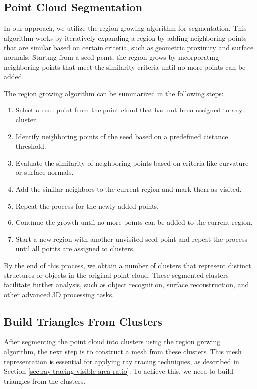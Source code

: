 \documentclass[11pt, a4paper,oneside,chapterprefix=false]{scrbook}
\begin{document}
\subsection{Point Cloud Segmentation}

In our approach, we utilize the region growing algorithm for segmentation. This algorithm works by iteratively expanding a region by adding neighboring points that are similar based on certain criteria, such as geometric proximity and surface normals. Starting from a seed point, the region grows by incorporating neighboring points that meet the similarity criteria until no more points can be added.

The region growing algorithm can be summarized in the following steps:
\begin{enumerate}
    \item Select a seed point from the point cloud that has not been assigned to any cluster.
    \item Identify neighboring points of the seed based on a predefined distance threshold.
    \item Evaluate the similarity of neighboring points based on criteria like curvature or surface normals.
    \item Add the similar neighbors to the current region and mark them as visited.
    \item Repeat the process for the newly added points.
    \item Continue the growth until no more points can be added to the current region.
    \item Start a new region with another unvisited seed point and repeat the process until all points are assigned to clusters.
\end{enumerate}

By the end of this process, we obtain a number of clusters that represent distinct structures or objects in the original point cloud. These segmented clusters facilitate further analysis, such as object recognition, surface reconstruction, and other advanced 3D processing tasks.


\subsection{Build Triangles From Clusters}

After segmenting the point cloud into clusters using the region growing algorithm, the next step is to construct a mesh from these clusters. This mesh representation is essential for applying ray tracing techniques, as described in Section \ref{sec:ray tracing visible area ratio}. To achieve this, we need to build triangles from the clusters.
\end{document}
